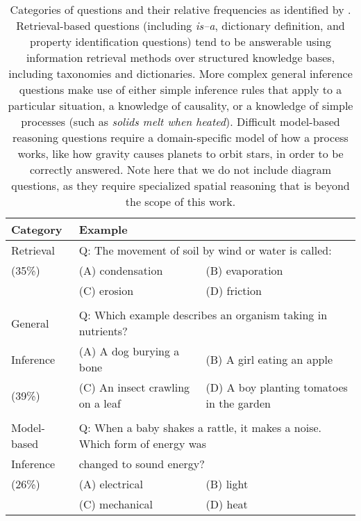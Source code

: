 %
%
\begin{table*}[t]
\caption{ 
Categories of questions and their relative frequencies as identified by \citet{clark:2013}. Retrieval-based questions (including \emph{is--a}, dictionary definition, and property identification questions) tend to be answerable using information retrieval methods over structured knowledge bases, including taxonomies and dictionaries. 
More complex general inference questions make use of either simple inference rules that apply to a particular situation, a knowledge of causality, or a knowledge of simple processes (such as \emph{solids melt when heated}).
Difficult model-based reasoning questions require a domain-specific model of how a process works, like how gravity causes planets to orbit stars, in order to be correctly answered.
Note here that we do not include diagram questions, as they require specialized spatial reasoning that is beyond the scope of this work. 
}
\begin{center}

\small

\begin{tabularx}{\textwidth}{p{2cm}p{5cm}p{5.9cm}}
\hline
Category &	\multicolumn{2}{l}{Example} \\
\hline
Retrieval	&	\multicolumn{2}{l}{Q: The movement of soil by wind or water is called:} \\
(35\%)		&   (A) condensation   	&	(B) evaporation   \\
			&	(C) erosion   		&	(D) friction \\
\\
General 	&	\multicolumn{2}{l}{Q: Which example describes an organism taking in nutrients?} \\
Inference	&   (A) A dog burying a bone			&   (B) A girl eating an apple	\\
(39\%)		&	(C) An insect crawling on a leaf	&  (D) A boy planting tomatoes in the garden  \\
\\
Model-based & 	\multicolumn{2}{l}{Q: When a baby shakes a rattle, it makes a noise. Which form of energy was} \\
Inference	& 	\multicolumn{2}{l}{changed to sound energy?} \\
(26\%)		&	(A) electrical	&   (B) light   \\
			&	(C) mechanical	&   (D) heat  \\
			
\end{tabularx}



\label{tab:inferenceexamples}
\end{center}
\end{table*}



